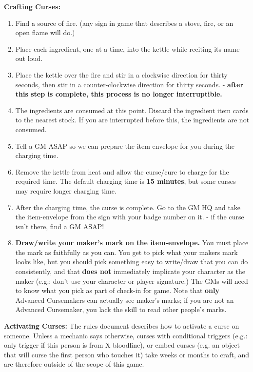 \documentclass[green]{GL2020}
\begin{document}
\textbf{Crafting Curses:}
\begin{enumerate}
	\item Find a source of fire. (any sign in game that describes a stove, fire, or an open flame will do.)
	\item Place each ingredient, one at a time, into the kettle while reciting its name out loud. 
	\item Place the kettle over the fire and stir in a clockwise direction for thirty seconds, then stir in a counter-clockwise direction for thirty seconds. -\textbf{ after this step is complete, this process is no longer interruptible.}
	\item The ingredients are consumed at this point. Discard the ingredient item cards to the nearest stock. If you are interrupted before this, the ingredients are not consumed.
	\item Tell a GM ASAP so we can prepare the item-envelope for you during the charging time.
	\item Remove the kettle from heat and allow the curse/cure to charge for the required time. The default charging time is \textbf{15 minutes}, but some curses may require longer charging time.
	\item After the charging time, the curse is complete. Go to the GM HQ and take the item-envelope from the sign with your badge number on it. - if the curse isn’t there, find a GM ASAP!
	\item \textbf{Draw/write your maker's mark on the item-envelope.} You must place the mark as faithfully as you can. You get to pick what your makers mark looks like, but you should pick something easy to write/draw that you can do consistently, and that \textbf{does not} immediately implicate your character as the maker (e.g.: don’t use your character or player signature.) The GMs will need to know what you pick as part of check-in for game. Note that \textbf{only} Advanced Cursemakers can actually see maker’s marks; if you are not an Advanced Cursemaker, you lack the skill to read other people's marks.
\end{enumerate}

\textbf{Activating Curses:}
The rules document describes how to activate a curse on someone. Unless a mechanic says otherwise, curses with conditional triggers (e.g.: only trigger if this person is from X bloodline), or embed curses (e.g. an object that will curse the first person who touches it) take weeks or months to craft, and are therefore outside of the scope of this game.
\end{document}
